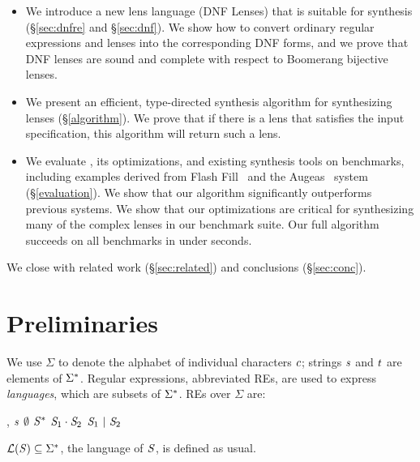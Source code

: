 \documentclass[acmsmall]{acmart}
\begin{document}
\begin{itemize}
\item 
  We introduce a new lens language (DNF Lenses) that is suitable for synthesis
  (\S\ref{sec:dnfre} and \S\ref{sec:dnf}).  
  We show how to convert ordinary regular expressions and lenses
  into the corresponding DNF forms, and we prove that DNF lenses are sound
  and complete with respect to Boomerang bijective lenses.

\item
  We present an efficient, type-directed synthesis algorithm for
  synthesizing lenses (\S\ref{algorithm}).  We prove that if there is a lens
  that satisfies the input specification, this algorithm will return such a lens.

\item
  We evaluate \Optician{}, its optimizations, and
  existing synthesis tools on  benchmarks, including
  examples derived from Flash Fill~\cite{gulwani-popl-2014} and the
  Augeas~\cite{augeas} system (\S \ref{evaluation}).  We show that our
  algorithm significantly outperforms previous systems.
  We show that our optimizations are critical for synthesizing many of
  the complex lenses in our benchmark suite.  Our full
  algorithm succeeds on all benchmarks in under 
  seconds.  \end{itemize} We close with related work
(\S \ref{sec:related}) and conclusions (\S \ref{sec:conc}).


\section{Preliminaries}
\label{preliminaries}


We use $\Sigma$ to denote the alphabet of individual characters $c$;
strings $\mathit{s}$ and $\mathit{t}$ are
elements of ${\Sigma}^*$.  Regular expressions, abbreviated REs, are
used to express \emph{languages}, which are subsets of ${\Sigma}^*$.
REs over $\Sigma$ are:
\begin{center}
  \Regex{},\RegexAlt{} \hspace{1em} \GEq{}
  \hspace{1em} $\mathit{s}$ \hspace{1em} 
  \GBar{} \hspace{1em} $\emptyset$ \hspace{1em} 
  \GBar{} \hspace{1em} ${\mathit{S}}^*$ \hspace{1em} 
  \GBar{} \hspace{1em} $\mathit{S}_1\cdot\mathit{S}_2$ \hspace{1em} 
  \GBar{} \hspace{1em} $\mathit{S}_1~|~\mathit{S}_2$
\end{center}
$\mathcal{L}(\mathit{S})\subseteq {\Sigma}^*$, the language of $\mathit{S}$, is
defined as usual. 
\end{document}
